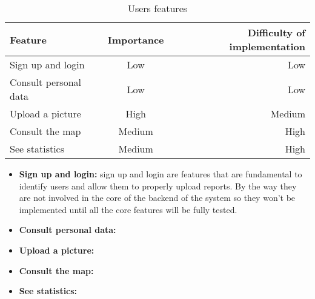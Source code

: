         \begin{table}[h!]
            \begin{center}
            
            \begin{tabular}{l|c|r} %
                \textbf{Feature} & \textbf{Importance} & \textbf{Difficulty of implementation}\\
                
                \hline
                Sign up and login & Low & Low\\
                Consult personal data & Low & Low\\
                Upload a picture & High & Medium\\
                Consult the map & Medium & High\\
                See statistics & Medium & High\\

            \end{tabular}
            \caption{Users features}
            \label{tab:table1}
            \end{center}
        \end{table}

        \begin{itemize}
            \item \textbf{Sign up and login:} sign up and login are features that are fundamental to identify users and allow them to 
                properly upload reports. By the way they are not involved in the core of the backend of the system so they won't be 
                implemented until all the core features will be fully tested. 
            \item \textbf{Consult personal data:}
            \item \textbf{Upload a picture:}
            \item \textbf{Consult the map:}
            \item \textbf{See statistics:}
        \end{itemize}
      
